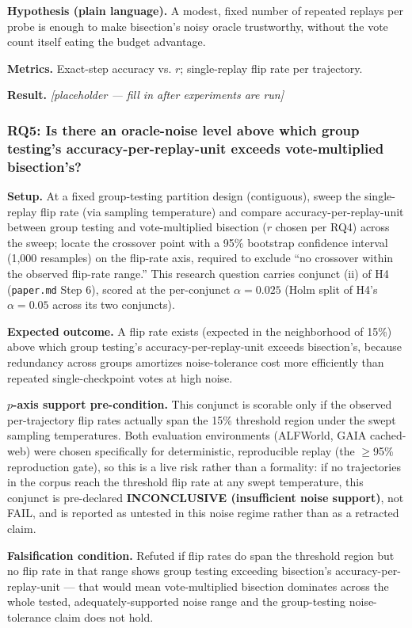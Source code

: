 \documentclass[11pt]{article}
\newcommand{\ph}{\textit{[placeholder --- fill in after experiments are run]}}
\begin{document}
\textbf{Hypothesis (plain language).} A modest, fixed number of repeated replays per probe is enough to make bisection's noisy oracle trustworthy, without the vote count itself eating the budget advantage.

\textbf{Metrics.} Exact-step accuracy vs. $r$; single-replay flip rate per trajectory.

\textbf{Result.} \ph

\subsubsection{RQ5: Is there an oracle-noise level above which group testing's accuracy-per-replay-unit exceeds vote-multiplied bisection's?}
\textbf{Setup.} At a fixed group-testing partition design (contiguous), sweep the single-replay flip rate (via sampling temperature) and compare accuracy-per-replay-unit between group testing and vote-multiplied bisection ($r$ chosen per RQ4) across the sweep; locate the crossover point with a 95\% bootstrap confidence interval (1{,}000 resamples) on the flip-rate axis, required to exclude ``no crossover within the observed flip-rate range.'' This research question carries conjunct (ii) of H4 (\texttt{paper.md} Step 6), scored at the per-conjunct $\alpha=0.025$ (Holm split of H4's $\alpha=0.05$ across its two conjuncts).

\textbf{Expected outcome.} A flip rate exists (expected in the neighborhood of 15\%) above which group testing's accuracy-per-replay-unit exceeds bisection's, because redundancy across groups amortizes noise-tolerance cost more efficiently than repeated single-checkpoint votes at high noise.

\textbf{$p$-axis support pre-condition.} This conjunct is scorable only if the observed per-trajectory flip rates actually span the 15\% threshold region under the swept sampling temperatures. Both evaluation environments (ALFWorld, GAIA cached-web) were chosen specifically for deterministic, reproducible replay (the $\geq$95\% reproduction gate), so this is a live risk rather than a formality: if no trajectories in the corpus reach the threshold flip rate at any swept temperature, this conjunct is pre-declared \textbf{INCONCLUSIVE (insufficient noise support)}, not FAIL, and is reported as untested in this noise regime rather than as a retracted claim.

\textbf{Falsification condition.} Refuted if flip rates do span the threshold region but no flip rate in that range shows group testing exceeding bisection's accuracy-per-replay-unit --- that would mean vote-multiplied bisection dominates across the whole tested, adequately-supported noise range and the group-testing noise-tolerance claim does not hold.
\end{document}
